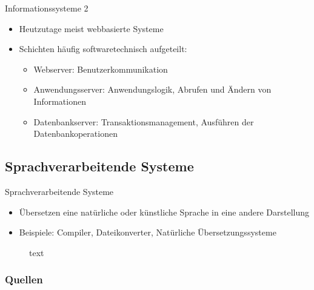 \documentclass{beamer}
\begin{document}
			\begin{frame}{Informationssysteme 2}
			\begin{itemize}
				\item Heutzutage meist webbasierte Systeme
				\item Schichten häufig softwaretechnisch aufgeteilt:
				\begin{itemize}
					\item Webserver: Benutzerkommunikation
					\item Anwendungsserver: Anwendungslogik, Abrufen und Ändern von Informationen
					\item Datenbankserver: Transaktionsmanagement, Ausführen der Datenbankoperationen
				\end{itemize}
			\end{itemize}
			\end{frame}
			
		\subsection{Sprachverarbeitende Systeme}
			\begin{frame}{Sprachverarbeitende Systeme}
				\begin{itemize}
					\item Übersetzen eine natürliche oder künstliche Sprache in eine andere Darstellung \cite[S. 207]{sommer}
					\item Beispiele: Compiler, Dateikonverter, Natürliche Übersetzungssysteme
				\end{itemize}
			\begin{figure}
				\caption{text}
			\end{figure}
			
				
			\end{frame}
	\begin{frame}[allowframebreaks]
		\frametitle{Quellen}
		\printbibliography[heading=none]
	\end{frame}
\end{document}
